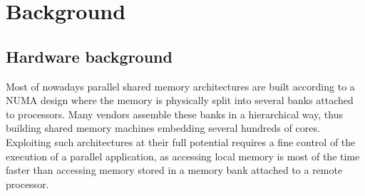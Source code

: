 \documentclass{Styles/llncs}
\newcommand{\benchs}{KASTORS }
\begin{document}

\section{Background}
\label{sec:background}
\subsection{Hardware background}
\label{sec:hardware}
Most of nowadays parallel shared memory architectures are built according to a NUMA design where the memory is physically split into several banks attached to processors.
Many vendors assemble these banks in a hierarchical way, thus building shared memory machines embedding several hundreds of cores.
Exploiting such architectures at their full potential requires a fine control of the execution of a parallel application, as accessing local memory is most of the time faster than accessing memory stored in a memory bank attached to a remote processor.
\end{document}
